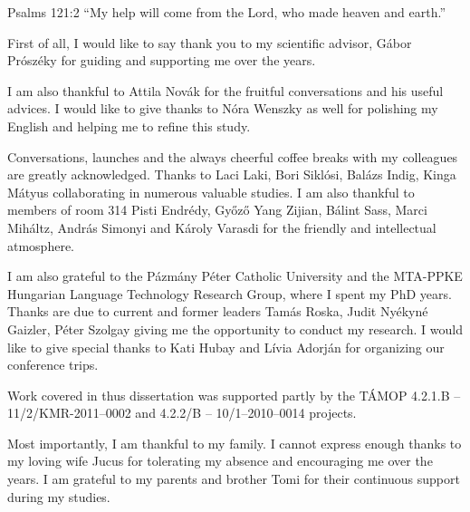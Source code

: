 \begin{chapquote}{Psalms 121:2}
``My help will come from the Lord, who made heaven and earth.''
\end{chapquote}

First of all, I would like to say thank you to my scientific advisor, Gábor Prószéky for guiding and supporting me over the years.

I am also thankful to Attila Novák for the fruitful conversations and his useful advices.
I would like to give thanks to Nóra Wenszky as well for polishing my English and helping me to refine this study.

Conversations, launches and the always cheerful coffee breaks with my colleagues are greatly acknowledged. 
Thanks to Laci Laki, Bori Siklósi, Balázs Indig, Kinga Mátyus collaborating in numerous valuable studies.
I am also thankful to members of room 314 Pisti Endrédy, Győző Yang Zijian, Bálint Sass, Marci Miháltz, András Simonyi and Károly Varasdi for the friendly and intellectual atmosphere.

I am also grateful to the Pázmány Péter Catholic University and the MTA-PPKE Hungarian Language Technology Research Group, where I spent my PhD years. 
Thanks are due to current and former leaders Tamás Roska, Judit Nyékyné Gaizler, Péter Szolgay giving me the opportunity to conduct my research.
I would like to give special thanks to Kati Hubay and Lívia Adorján for organizing our conference trips.

Work covered in thus dissertation was supported partly by the TÁMOP 4.2.1.B -- 11/2/KMR-2011–0002 and 4.2.2/B -- 10/1–2010–0014 projects.

Most importantly, I am thankful to my family.
I cannot express enough thanks to my loving wife Jucus for tolerating my  absence and encouraging me over the years.
I am grateful to my parents and brother Tomi for their continuous support during my studies.
